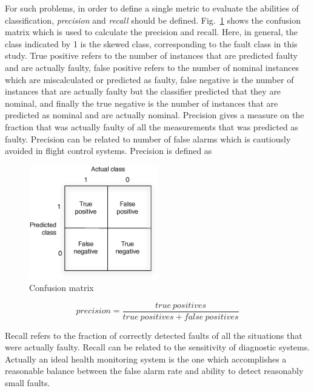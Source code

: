 For such problems, in order to define a single metric to evaluate the abilities of classification, \emph{precision} and \emph{recall} should be defined.   
Fig.~\ref{fig:confusionMatrix} shows the confusion matrix which is used to calculate the precision and recall. 
Here, in general, the class indicated by 1 is the skewed class, corresponding to the fault class in this study. 
True positive refers to the number of instances that are predicted faulty and are actually faulty, false positive refers to the number of nominal instances which are miscalculated or predicted as faulty, false negative is the number of instances that are actually faulty but the classifier predicted that they are nominal, and finally the true negative is the number of instances that are predicted as nominal and are actually nominal.
Precision gives a measure on the fraction that was actually faulty of all the measurements that was predicted as faulty. 
Precision can be related to number of false alarms which is cautiously avoided in flight control systems. Precision is defined as 

\begin{figure}
\begin{center}
\includegraphics[width=0.5\textwidth]{figures/confusionMatrix}    %
\caption{Confusion matrix} 
\label{fig:confusionMatrix}
\end{center}
\end{figure}


\begin{equation}
precision = \frac{true \ positives}{true \ positives + false \ positives}
\end{equation}

Recall refers to the fraction of correctly detected faults of all the situations that were actually faulty. 
Recall can be related to the sensitivity of diagnostic systems. 
Actually an ideal health monitoring system is the one which accomplishes a reasonable balance between the false alarm rate and ability to detect reasonably small faults. 

